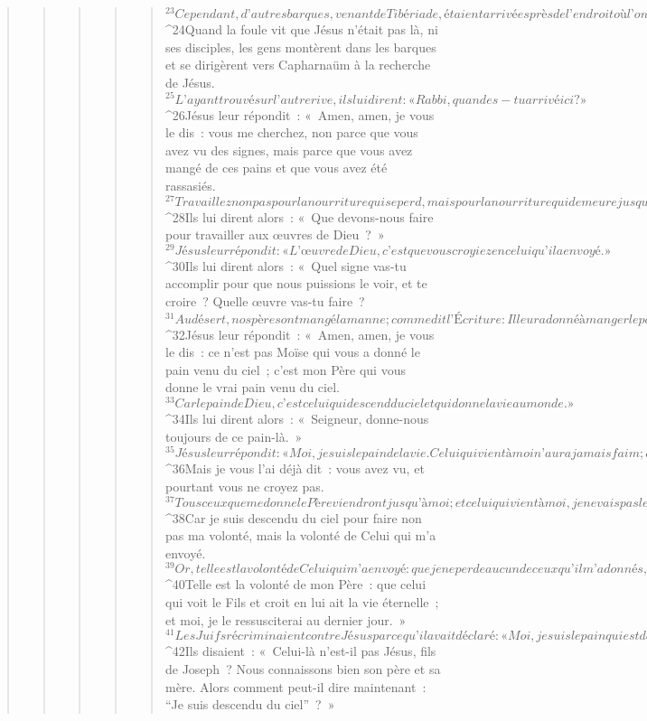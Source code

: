 \begin{verse}
\begin{verse}
\begin{verse}
\begin{verse}
\begin{verse}
${}^{23}Cependant, d’autres barques, venant de Tibériade, étaient arrivées près de l’endroit où l’on avait mangé le pain après que le Seigneur eut rendu grâce. 
${}^{24}Quand la foule vit que Jésus n’était pas là, ni ses disciples, les gens montèrent dans les barques et se dirigèrent vers Capharnaüm à la recherche de Jésus. 
${}^{25}L’ayant trouvé sur l’autre rive, ils lui dirent : « Rabbi, quand es-tu arrivé ici ? »
${}^{26}Jésus leur répondit : « Amen, amen, je vous le dis : vous me cherchez, non parce que vous avez vu des signes, mais parce que vous avez mangé de ces pains et que vous avez été rassasiés. 
${}^{27}Travaillez non pas pour la nourriture qui se perd, mais pour la nourriture qui demeure jusque dans la vie éternelle, celle que vous donnera le Fils de l’homme, lui que Dieu, le Père, a marqué de son sceau. » 
${}^{28}Ils lui dirent alors : « Que devons-nous faire pour travailler aux œuvres de Dieu ? » 
${}^{29}Jésus leur répondit : « L’œuvre de Dieu, c’est que vous croyiez en celui qu’il a envoyé. »
${}^{30}Ils lui dirent alors : « Quel signe vas-tu accomplir pour que nous puissions le voir, et te croire ? Quelle œuvre vas-tu faire ? 
${}^{31}Au désert, nos pères ont mangé la manne ; comme dit l’Écriture : Il leur a donné à manger le pain venu du ciel. » 
${}^{32}Jésus leur répondit : « Amen, amen, je vous le dis : ce n’est pas Moïse qui vous a donné le pain venu du ciel ; c’est mon Père qui vous donne le vrai pain venu du ciel. 
${}^{33}Car le pain de Dieu, c’est celui qui descend du ciel et qui donne la vie au monde. » 
${}^{34}Ils lui dirent alors : « Seigneur, donne-nous toujours de ce pain-là. » 
${}^{35}Jésus leur répondit : « Moi, je suis le pain de la vie. Celui qui vient à moi n’aura jamais faim ; celui qui croit en moi n’aura jamais soif. 
${}^{36}Mais je vous l’ai déjà dit : vous avez vu, et pourtant vous ne croyez pas. 
${}^{37}Tous ceux que me donne le Père viendront jusqu’à moi ; et celui qui vient à moi, je ne vais pas le jeter dehors. 
${}^{38}Car je suis descendu du ciel pour faire non pas ma volonté, mais la volonté de Celui qui m’a envoyé. 
${}^{39}Or, telle est la volonté de Celui qui m’a envoyé : que je ne perde aucun de ceux qu’il m’a donnés, mais que je les ressuscite au dernier jour. 
${}^{40}Telle est la volonté de mon Père : que celui qui voit le Fils et croit en lui ait la vie éternelle ; et moi, je le ressusciterai au dernier jour. »
${}^{41}Les Juifs récriminaient contre Jésus parce qu’il avait déclaré : « Moi, je suis le pain qui est descendu du ciel. » 
${}^{42}Ils disaient : « Celui-là n’est-il pas Jésus, fils de Joseph ? Nous connaissons bien son père et sa mère. Alors comment peut-il dire maintenant : “Je suis descendu du ciel” ? » 

\end{verse}
\end{verse}
\end{verse}
\end{verse}
\end{verse}
